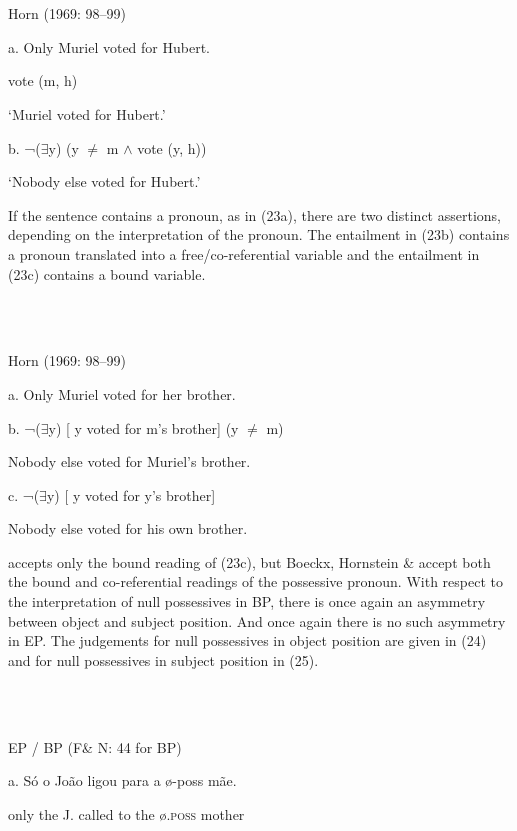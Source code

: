 \documentclass[output=paper]{langsci/langscibook}
\begin{document}
\ea%
    \label{ex:key:22}
    \gll\\
        \\
    \glt
    \z

          Horn (1969: 98–99)

  a.  Only Muriel voted for Hubert.

    vote (m, h)   

‘Muriel voted for Hubert.’

  b.  ¬(${\exists}$y) (y ${\neq}$ m ${\wedge}$ vote (y, h))

‘Nobody else voted for Hubert.’

If the sentence contains a pronoun, as in (23a), there are two distinct assertions, depending on the interpretation of the pronoun. The entailment in (23b) contains a pronoun translated into a free/co-referential variable and the entailment in (23c) contains a bound variable.

\ea%
    \label{ex:key:23}
    \gll\\
        \\
    \glt
    \z

          Horn (1969: 98–99)

  a.  Only Muriel voted for her brother.

  b.  ¬(${\exists}$y) [ y voted for m’s brother] (y ${\neq}$ m)  

Nobody else voted for Muriel’s brother.

  c.  ¬(${\exists}$y) [ y voted for y’s brother]

Nobody else voted for his own brother.

\citet[102]{Horn1969} accepts only the bound reading of (23c), but Boeckx, Hornstein \& \citet[197]{Nunes2010} accept both the bound and co-referential readings of the possessive pronoun. With respect to the interpretation of null possessives in BP, there is once again an asymmetry between object and subject position. And once again there is no such asymmetry in EP. The judgements for null possessives in object position are given in (24) and for null possessives in subject position in (25).

\ea%
    \label{ex:key:24}
    \gll\\
        \\
    \glt
    \z

          EP / BP (F\& N: 44 for BP)

  a.  Só o João ligou para a ø-poss mãe.

only the J. called to the ø\textsc{.poss} mother
\end{document}
